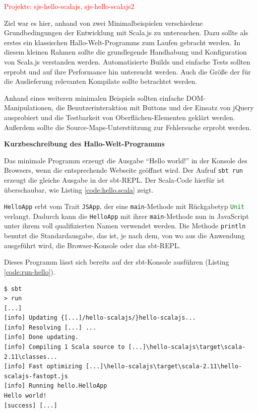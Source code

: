 \documentclass[a4paper, 12pt, hidelinks, listof=totoc, listoftables=totoc, bibliography=totoc]{scrreprt}
\newcommand{\code}[1]{\lstinline[language=Scala, style=inline]|#1|}
\newcommand{\scala}[1]{\lstinline[language=Scala, style=inline]|#1|}
\newcommand{\TODO}[1]{\textcolor{red}{#1}\newline}
\newcommand{\MyMiniSec}[1]{\rmfamily\fontsize{12}{15}\selectfont
	\vspace{7pt}\textbf{#1} %
}
\begin{document}

\TODO{Projekte: sjs-hello-scalajs, sjs-hello-scalajs2}

Ziel war es hier, anhand von zwei Minimalbeispielen verschiedene Grundbedingungen der Entwicklung mit Scala.js zu untersuchen. Dazu sollte als erstes ein klassischen Hallo-Welt-Programms zum Laufen gebracht werden. In diesem kleinen Rahmen sollte die grundlegende Handhabung und Konfiguration von Scala.js verstanden werden. Automatisierte Builds und einfache Tests sollten erprobt und auf ihre Performance hin untersucht werden. Auch die Größe der für die Auslieferung relevanten Kompilate sollte betrachtet werden.

Anhand eines weiteren minimalen Beispiels sollten einfache \ac{DOM}-Manipulationen, die Benutzerinteraktion mit Buttons und der Einsatz von jQuery ausprobiert und die Testbarkeit von Oberflächen-Elementen geklärt werden. Außerdem sollte die Source-Maps-Unterstützung zur Fehlersuche erprobt werden.


\MyMiniSec{Kurzbeschreibung des Hallo-Welt-Programms}

Das minimale Programm erzeugt die Ausgabe "`Hello world!"' in der Konsole des Browsers, wenn die entsprechende Webseite geöffnet wird. Der Aufruf \code{sbt run} erzeugt die gleiche Ausgabe in der sbt-\ac{REPL}. Der Scala-Code hierfür ist überschaubar, wie Listing \ref{code:hello.scala} zeigt.



\scala{HelloApp} erbt vom Trait \scala{JSApp}, der eine \scala{main}-Methode mit Rückgabetyp \scala{Unit} verlangt. Dadurch kann die \scala{HelloApp} mit ihrer \scala{main}-Methode nun in JavaScript unter ihrem voll qualifizierten Namen verwendet werden. Die Methode \scala{println} benutzt die Standardausgabe, das ist, je nach dem, von wo aus die Anwendung ausgeführt wird, die Browser-Konsole oder das sbt-\ac{REPL}.

Dieses Programm lässt sich bereits auf der sbt-Konsole ausführen (Listing \ref{code:run-hello}).

\begin{lstlisting}[caption={Lauf des Hallo-Welt-Programms in der sbt-\ac{REPL}.}, label={code:run-hello}]
$ sbt
> run
[...]
[info] Updating {[...]/hello-scalajs/}hello-scalajs...
[info] Resolving [...] ...
[info] Done updating.
[info] Compiling 1 Scala source to [...]\hello-scalajs\target\scala-2.11\classes...
[info] Fast optimizing [...]\hello-scalajs\target\scala-2.11\hello-scalajs-fastopt.js
[info] Running hello.HelloApp
Hello world!
[success] [...]
\end{lstlisting}
\end{document}
